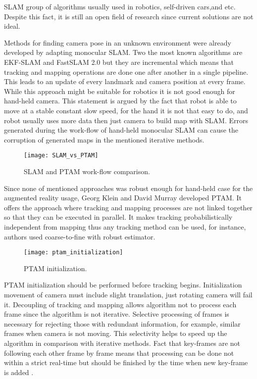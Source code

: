 \documentclass[../../../../main]{subfiles}
\begin{document}
\ac{SLAM} group of algorithms usually used in robotics, self-driven cars,and etc. Despite this fact, it is still an open field of research since current solutions are not ideal.

Methods for finding camera pose in an unknown environment were already developed by adapting monocular \ac{SLAM}. Two the most known algorithms are EKF-SLAM and FastSLAM 2.0 \cite{fast_slam} but they are incremental which means that tracking and mapping operations are done one after another in a single pipeline. This leads to an update of every landmark and camera position at every frame. While this approach might be suitable for robotics it is not good enough for hand-held camera. This statement is argued by the fact that robot is able to move at a stable constant slow speed, for the hand it is not that easy to do, and robot usually uses more data then just camera to build map with \ac{SLAM}. Errors generated during the work-flow of hand-held monocular \ac{SLAM} can cause the corruption of generated maps in the mentioned iterative methods.

\begin{figure} [ht!]
    \begin{center}
        \texttt{[image: SLAM\_vs\_PTAM]}
        \caption{\ac{SLAM} and \ac{PTAM} work-flow comparison.}
        \label{fig:slam}
    \end{center}
\end{figure}

Since none of mentioned approaches was robust enough for hand-held case for the augmented reality usage, Georg Klein and David Murray developed \ac{PTAM}. It offers the approach where tracking and mapping processes are not linked together so that they can be executed in parallel. It makes tracking probabilistically independent from mapping thus any tracking method can be used, for instance, authors used coarse-to-fine with robust estimator.

\begin{figure} [ht!]
    \begin{center}
        \texttt{[image: ptam\_initialization]}
        \caption{\ac{PTAM} initialization.}
        \label{fig:slam}
    \end{center}
\end{figure}

\ac{PTAM} initialization should be performed before tracking begins. Initialization movement of camera must include slight translation, just rotating camera will fail it. 
Decoupling of tracking and mapping allows algorithm not to process each frame since the algorithm is not iterative. Selective processing of frames is necessary for rejecting those with redundant information, for example, similar frames when camera is not moving. This selectivity helps to speed up the algorithm in comparison with iterative methods. Fact that key-frames are not following each other frame by frame means that processing can be done not within a strict real-time but should be finished by the time when new key-frame is added \cite{ptam}.
\end{document}
